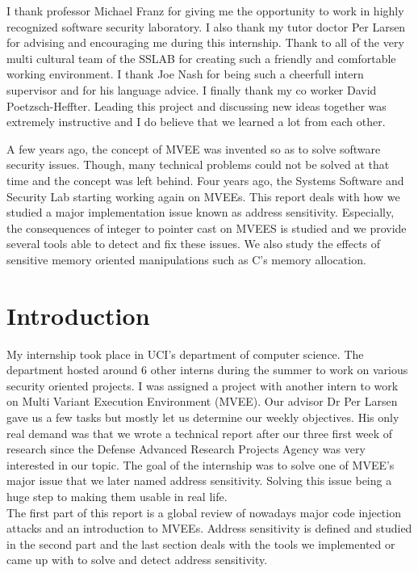 \documentclass[english]{enstaPRE}
\begin{document}
\couverture






I thank professor Michael Franz for giving me the opportunity to work in highly recognized software security laboratory.
I also thank my tutor doctor Per Larsen for advising and encouraging me during this internship.
Thank to all of the very multi cultural team of the SSLAB for creating such a friendly and comfortable working environment.
I thank Joe Nash for being such a cheerfull intern supervisor and for his language advice.
I finally thank my co worker David Poetzsch-Heffter. Leading this project and discussing new ideas together was extremely 
instructive and I do believe that we learned a lot from each other.


A few years ago, the concept of MVEE was invented so as to solve software security issues. 
Though, many technical problems could not be solved at that time and the concept was left behind.
Four years ago, the Systems Software and Security Lab starting working again on MVEEs.
This report deals with how we studied a major implementation issue known as address sensitivity.
Especially, the consequences of integer to pointer cast on MVEES is studied and we provide several tools able to detect and fix 
these issues. We also study the effects of sensitive memory oriented manipulations such as C's memory allocation.
\tableofcontents

\part{Introduction}

My internship took place in UCI's department of computer science. The department hosted around 6 other interns during the summer to 
work on various security oriented projects. I was assigned a project with another intern to work on Multi Variant Execution 
Environment (MVEE). Our advisor Dr Per Larsen gave us a few tasks but mostly let us determine our weekly objectives.
His only real demand was that we wrote a technical report after our three first week of research since the Defense Advanced
Research Projects Agency was very interested in our topic.
The goal of the internship was to solve one of MVEE's major issue that we later named address sensitivity. Solving this issue being
a huge step to making them usable in real life. \\
The first part of this report is a global review of nowadays major code injection attacks and an introduction to MVEEs.
Address sensitivity is defined and studied in the second part and the last section deals with the tools we implemented 
or came up with to solve and detect address sensitivity.
\end{document}
